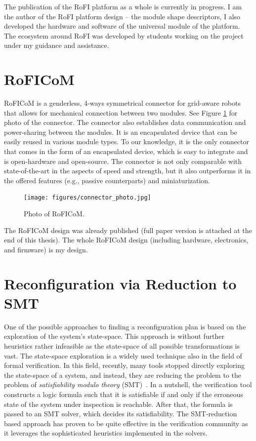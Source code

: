 The publication of the RoFI platform as a whole is currently in progress. I am
the author of the RoFI platform design -- the module shape descriptors, I also
developed the hardware and software of the universal module of the platform. The
ecosystem around RoFI was developed by students working on the project under my
guidance and assistance.

\section{RoFICoM}\label{connector}

RoFICoM is a genderless, 4-ways symmetrical connector for grid-aware robots that
allows for mechanical connection between two modules. See Figure
\ref{fig:roficom} for photo of the connector. The connector also establishes
data communication and power-sharing between the modules. It is an encapsulated
device that can be easily reused in various module types. To our knowledge, it
is the only connector that comes in the form of an encapsulated device, which is
easy to integrate and is open-hardware and open-source. The connector is not
only comparable with state-of-the-art in the aspects of speed and strength, but
it also outperforms it in the offered features (e.g., passive counterparts) and
miniaturization.

\begin{figure}[t]
    \centering
    \texttt{[image: figures/connector\_photo.jpg]}
    \caption{Photo of RoFICoM.}
    \label{fig:roficom}
\end{figure}

The RoFICoM design was already published \cite{DBLP:conf/iros/MrazekB19} (full
paper version is attached at the end of this thesis). The whole RoFICoM design
(including hardware, electronics, and firmware) is my design.

\section{Reconfiguration via Reduction to SMT}\label{smt}

One of the possible approaches to finding a reconfiguration plan is based on the
exploration of the system's state-space. This approach is without further
heuristics rather infeasible as the state-space of all possible transformations
is vast. The state-space exploration is a widely used technique also in the
field of formal verification. In this field, recently, many tools stopped
directly exploring the state-space of a system, and instead, they are reducing
the problem to the problem of \emph{satisfiability modulo theory}
(SMT)~\cite{DBLP:series/faia/2009-185}. In a nutshell, the verification tool
constructs a logic formula such that it is satisfiable if and only if the
erroneous state of the system under inspection is reachable. After that, the
formula is passed to an SMT solver, which decides its satisfiability. The
SMT-reduction based approach has proven to be quite effective in the
verification community as it leverages the sophisticated heuristics implemented
in the solvers.

